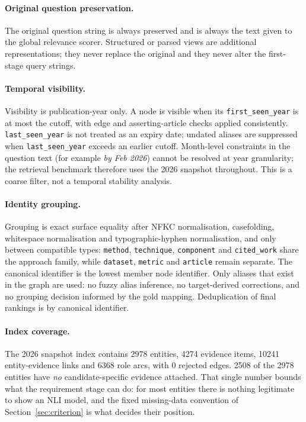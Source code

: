 \documentclass[11pt,a4paper]{article}
\begin{document}
\paragraph{Original question preservation.} The original question string is always preserved and is always the text given to the global relevance scorer. Structured or parsed views are additional representations; they never replace the original and they never alter the first-stage query strings.

\paragraph{Temporal visibility.} Visibility is publication-year only. A node is visible when its \texttt{first\_seen\_year} is at most the cutoff, with edge and asserting-article checks applied consistently. \texttt{last\_seen\_year} is not treated as an expiry date; undated aliases are suppressed when \texttt{last\_seen\_year} exceeds an earlier cutoff. Month-level constraints in the question text (for example \emph{by Feb 2026}) cannot be resolved at year granularity; the retrieval benchmark therefore uses the 2026 snapshot throughout. This is a coarse filter, not a temporal stability analysis.

\paragraph{Identity grouping.} Grouping is exact surface equality after NFKC normalisation, casefolding, whitespace normalisation and typographic-hyphen normalisation, and only between compatible types: \texttt{method}, \texttt{technique}, \texttt{component} and \texttt{cited\_work} share the approach family, while \texttt{dataset}, \texttt{metric} and \texttt{article} remain separate. The canonical identifier is the lowest member node identifier. Only aliases that exist in the graph are used: no fuzzy alias inference, no target-derived corrections, and no grouping decision informed by the gold mapping. Deduplication of final rankings is by canonical identifier.

\paragraph{Index coverage.} The 2026 snapshot index contains 2978 entities, 4274 evidence items, 10241 entity-evidence links and 6368 role arcs, with 0 rejected edges. 2508 of the 2978 entities have \emph{no} candidate-specific evidence attached. That single number bounds what the requirement stage can do: for most entities there is nothing legitimate to show an NLI model, and the fixed missing-data convention of Section~\ref{sec:criterion} is what decides their position.
\end{document}
